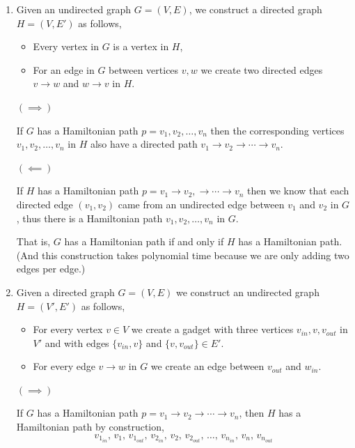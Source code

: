 \documentclass[12pt]{article}
\begin{document}
\begin{solution}
    \bbni
    \begin{enumerate}
        \item Given an undirected graph $G = (V, E)$, we construct a directed graph $H = (V, E')$ as follows,
        \begin{itemize}
            \item Every vertex in $G$ is a vertex in $H$, 
            \item For an edge in $G$ between vertices $v, w$ we create two directed edges $v \to w$ and $w \to v$ in $H$. 
        \end{itemize}

        $(\implies)$

        If $G$ has a Hamiltonian path $p = v_1, v_2, \ldots, v_n$ then the corresponding vertices $v_1, v_2, \ldots, v_n$ in $H$ also have a directed path $v_1 \to v_2 \to \cdots \to v_n$. 
        
        $(\impliedby)$ 

        If $H$ has a Hamiltonian path $p = v_1 \to v_2, \to \cdots \to v_n$ then we know that each directed edge $(v_1, v_2)$ came from an undirected edge between $v_1$ and $v_2$ in $G$, thus there is a Hamiltonian path $v_1, v_2, \ldots, v_n$ in $G$. 

        That is, $G$ has a Hamiltonian path if and only if $H$ has a Hamiltonian path. (And this construction takes polynomial time because we are only adding two edges per edge.)

        \item Given a directed graph $G = (V, E)$ we construct an undirected graph $H = (V', E')$ as follows, 
        \begin{itemize}
            \item For every vertex $v \in V$ we create a gadget with three vertices $v_{in}, v, v_{out}$ in $V'$ and with edges $\{v_{in}, v\}$ and $\{v, v_{out}\} \in E'$.
            \item For every edge $v \to w$ in $G$ we create an edge between $v_{out}$ and $w_{in}$. 
        \end{itemize}

        $(\implies)$

        If $G$ has a Hamiltonian path $p = v_1 \to v_2 \to \cdots \to v_n$, then $H$ has a Hamiltonian path by construction, 
        \[v_{1_{in}}, \, v_{1}, \,  v_{1_{out}}, \, v_{2_{in}}, \,  v_{2}, \,  v_{2_{out}}, \,  \ldots, \, v_{n_{in}}, \, v_{n}, \, v_{n_{out}}\]



\end{enumerate}
\end{solution}
\end{document}
